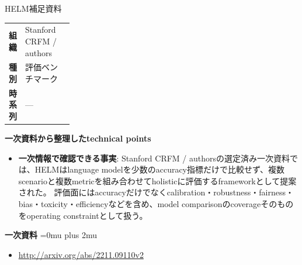 \begin{technicalnote}{HELM}{補足資料}
\begingroup
\begin{tabularx}{\linewidth}{@{}>{\bfseries}p{0.22\linewidth}X@{}}
組織 & Stanford CRFM / authors \\
種別 & 評価ベンチマーク \\
時系列 & — \\
\end{tabularx}
\smallskip
{\bfseries 一次資料から整理したtechnical points}
\begin{itemize}[leftmargin=1.5em,itemsep=0.35em]
\item \textbf{一次情報で確認できる事実}: Stanford CRFM / authorsの選定済み一次資料では、HELMはlanguage modelを少数のaccuracy指標だけで比較せず、複数scenarioと複数metricを組み合わせてholisticに評価するframeworkとして提案された。 評価面にはaccuracyだけでなくcalibration・robustness・fairness・bias・toxicity・efficiencyなどを含め、model comparisonのcoverageそのものをoperating constraintとして扱う。
\end{itemize}
\begin{minipage}{\linewidth}
\begin{samepage}
{\bfseries 一次資料}
\begingroup\sloppy
\Urlmuskip=0mu plus 2mu\relax
\begin{itemize}[leftmargin=1.5em,itemsep=0.25em]
\item {\scriptsize\url{http://arxiv.org/abs/2211.09110v2}}
\end{itemize}
\endgroup
\end{samepage}
\end{minipage}
\endgroup
\end{technicalnote}
\medskip
